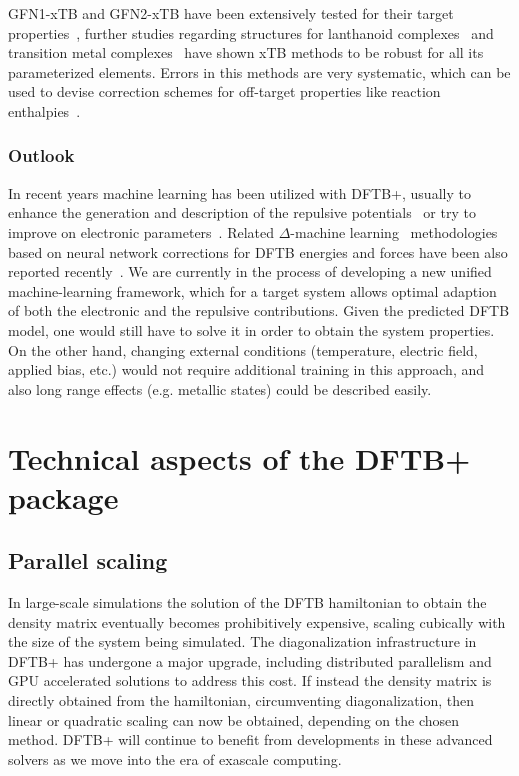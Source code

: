 \documentclass[reprint,onecolumn,superscriptaddress]{revtex4-1}
\newcommand{\dftbp}{DFTB+}
\begin{document}
GFN1-xTB and GFN2-xTB have been extensively tested for their target
properties~\cite{bannwarth2019}, further studies regarding structures for
lanthanoid complexes~\cite{bursch2017} and transition metal
complexes~\cite{bursch2019} have shown xTB methods to be robust for all its
parameterized elements.  Errors in this methods are very systematic, which can
be used to devise correction schemes for off-target properties like reaction
enthalpies~\cite{kromann2018}.

\subsubsection{Outlook}

In recent years machine learning has been utilized with \dftbp{}, usually to
enhance the generation and description of the repulsive
potentials~\cite{Knaup2007, Kranz2018, Zhu2019, Huran2018, Goldman2018} or try
to improve on electronic parameters~\cite{Li2018, Huran2018}. Related
$\Delta$-machine learning~\cite{Ramakrishnan2015} methodologies based on neural
network corrections for DFTB energies and forces have been also reported
recently~\cite{Shen2016, Shen2018}. We are currently in the process of developing
a new unified machine-learning framework, which for a target system allows
optimal adaption of both the electronic and the repulsive contributions. Given
the predicted DFTB model, one would still have to solve it in order to obtain
the system properties. On the other hand, changing external conditions
(temperature, electric field, applied bias, etc.) would not require additional
training in this approach, and also long range effects (e.g. metallic states)
could be described easily.


\section{Technical aspects of the \dftbp{} package}


\subsection{Parallel scaling}

In large-scale simulations the solution of the DFTB hamiltonian to obtain the
density matrix eventually becomes prohibitively expensive, scaling cubically
with the size of the system being simulated. The diagonalization infrastructure
in \dftbp{} has undergone a major upgrade, including distributed parallelism and
GPU accelerated solutions to address this cost. If instead the density matrix is
directly obtained from the hamiltonian, circumventing diagonalization, then
linear or quadratic scaling can now be obtained, depending on the chosen method.
\dftbp{} will continue to benefit from developments in these advanced solvers as
we move into the era of exascale computing.
\end{document}
